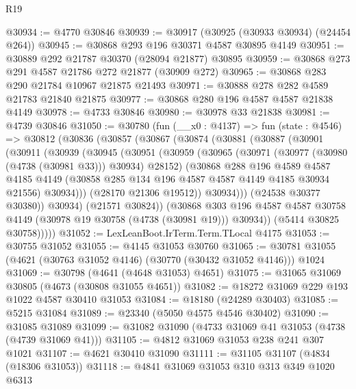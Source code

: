 \begin{lexlean}{R19}
\begin{coremodule}
@30934 := @4770 @30846
@30939 := @30917 (@30925 (@30933 @30934) (@24454 @264))
@30945 := @30868 @293 @196 @30371 @4587 @30895 @4149
@30951 := @30889 @292 @21787 @30370 (@28094 @21877) @30895
@30959 := @30868 @273 @291 @4587 @21786 @272 @21877 (@30909 @272)
@30965 := @30868 @283 @290 @21784 @10967 @21875 @21493
@30971 := @30888 @278 @282 @4589 @21783 @21840 @21875
@30977 := @30868 @280 @196 @4587 @4587 @21838 @4149
@30978 := @4733 @30846
@30980 := @30978 @33 @21838
@30981 := @4739 @30846
@31050 := @30780
    (fun (__x0 : @4137) =>
    fun (state : @4546) =>
    @30812
      (@30836
        (@30857
          (@30867
            (@30874
              (@30881
                (@30887
                  (@30901
                    (@30911
                      (@30939
                        (@30945
                          (@30951
                            (@30959
                              (@30965
                                (@30971 (@30977 (@30980 (@4738 (@30981 @33))) @30934) @28152)
                                (@30868
                                  @288
                                  @196
                                  @4589
                                  @4587
                                  @4185
                                  @4149
                                  (@30858 @285 @134 @196 @4587 @4587 @4149 @4185 @30934 @21556)
                                  @30934)))
                            (@28170 @21306 @19512))
                          @30934)))
                    (@24538 @30377 @30380))
                  @30934)
                (@21571 @30824))
              (@30868
                @303
                @196
                @4587
                @4587
                @30758
                @4149
                (@30978 @19 @30758 (@4738 (@30981 @19)))
                @30934))
            (@5414 @30825 @30758)))))
@31052 := LexLeanBoot.IrTerm.Term.TLocal @4175
@31053 := @30755 @31052
@31055 := @4145 @31053 @30760
@31065 := @30781 @31055 (@4621 (@30763 @31052 @4146) (@30770 (@30432 @31052 @4146))) @1024
@31069 := @30798 (@4641 (@4648 @31053) @4651)
@31075 := @31065 @31069 @30805 (@4673 (@30808 @31055 @4651))
@31082 := @18272 @31069 @229 @193 @1022 @4587 @30410 @31053
@31084 := @18180 (@24289 @30403)
@31085 := @5215 @31084
@31089 := @23340 (@5050 @4575 @4546 @30402)
@31090 := @31085 @31089
@31099 := @31082 @31090 (@4733 @31069 @41 @31053 (@4738 (@4739 @31069 @41)))
@31105 := @4812 @31069 @31053 @238 @241 @307 @1021
@31107 := @4621 @30410 @31090
@31111 := @31105 @31107 (@4834 (@18306 @31053))
@31118 := @4841 @31069 @31053 @310 @313 @349 @1020 @6313

\end{coremodule}
\end{lexlean}
